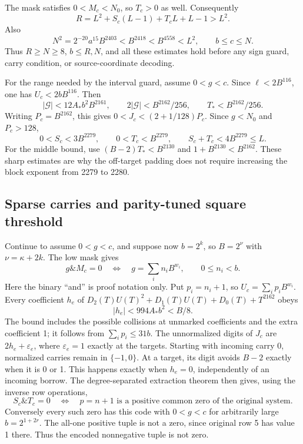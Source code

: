The mask satisfies $0<M_c<N_0$, so $T_c>0$ as well. Consequently
\[
 R=L^2+S_c(L-1)+T_cL+L-1>L^2.
\]
Also
\[
 N^2=2^{-20}a^{15}B^{2403}<B^{2418}<B^{4558}<L^2,
 \qquad b\le c\le N.
\]
Thus $R\ge N\ge8$, $b\le R,N$, and all these estimates hold before any
sign guard, carry condition, or source-coordinate decoding.

For the range needed by the interval guard, assume $0<g<c$.
Since $\ell<2B^{116}$, one has $U_c<2bB^{116}$. Then
\[
 |\mathcal G|<12A_*b^2B^{2161},\qquad
 2|\mathcal G|<B^{2162}/256,\qquad T_*<B^{2162}/256.
\]
Writing $P_c=B^{2162}$, this gives
$0<J_c<(2+1/128)P_c$. Since $g<N_0$ and $P_c>128$,
\[
 0<S_c<3B^{2279},\qquad 0<T_c<B^{2279},\qquad
 S_c+T_c<4B^{2279}\le L.
\]
For the middle bound, use $(B-2)T_*<B^{2130}$ and
$1+B^{2130}<B^{2162}$. These sharp estimates are why the off-target padding
does not require increasing the block exponent from 2279 to 2280.

\subsection{Sparse carries and parity-tuned square threshold}
Continue to assume $0<g<c$, and suppose now $b=2^k$, so $B=2^\nu$ with $\nu=\kappa+2k$.
The low mask gives
\[
 g\mathbin{\&}M_c=0\quad\Longleftrightarrow\quad
 g=\sum_i n_i B^{w_i},\qquad0\le n_i<b.
\]
Here the binary ``and'' is proof notation only. Put $p_i=n_i+1$, so
$U_c=\sum_i p_iB^{w_i}$. Every coefficient $h_e$ of
$D_2(T)U(T)^2+D_1(T)U(T)+D_0(T)+T^{2162}$ obeys
\[
 |h_e|<994A_*b^2<B/8.
\]
The bound includes the possible collisions at unmarked coefficients and the
extra coefficient 1; it follows from $\sum_i p_i\le31b$.
The unnormalized digits of $J_c$ are $2h_e+\varepsilon_e$, where
$\varepsilon_e=1$ exactly at the targets. Starting with incoming carry 0,
normalized carries remain in $\{-1,0\}$. At a target, its digit avoids
$B-2$ exactly when it is 0 or 1. This happens exactly when $h_e=0$,
independently of an incoming borrow. The degree-separated extraction theorem
then gives, using the inverse row operations,
\[
 S_c\mathbin{\&}T_c=0\quad\Longleftrightarrow\quad
 p=n+1\text{ is a positive common zero of the original system}.
\]
Conversely every such zero has this code with $0<g<c$ for arbitrarily large
$b=2^{1+2r}$. The all-one positive tuple is not a zero, since original row 5
has value 1 there. Thus the encoded nonnegative tuple is not zero.

